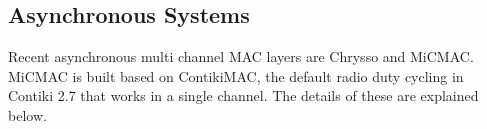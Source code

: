 



\subsection{Asynchronous Systems}
Recent asynchronous multi channel MAC layers are Chrysso and MiCMAC. MiCMAC is built based on ContikiMAC, the default radio duty cycling in Contiki 2.7 that works in a single channel. The details of these are explained below.

